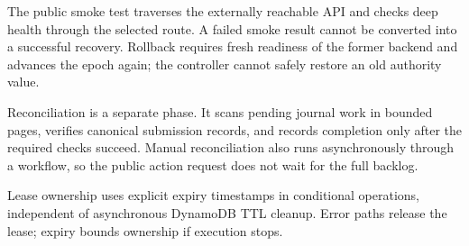 \FloatBarrier
The public smoke test traverses the externally reachable API and checks deep health through the selected route. A failed smoke result cannot be converted into a successful recovery. Rollback requires fresh readiness of the former backend and advances the epoch again; the controller cannot safely restore an old authority value.

Reconciliation is a separate phase. It scans pending journal work in bounded pages, verifies canonical submission records, and records completion only after the required checks succeed. Manual reconciliation also runs asynchronously through a workflow, so the public action request does not wait for the full backlog.

Lease ownership uses explicit expiry timestamps in conditional operations, independent of asynchronous DynamoDB TTL cleanup. Error paths release the lease; expiry bounds ownership if execution stops.
